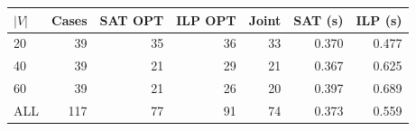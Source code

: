 \begin{tabular}{@{}lrrrrrr@{}}
\toprule
$|V|$ & Cases & SAT OPT & ILP OPT & Joint & SAT (s) & ILP (s)\\
\midrule
20 & 39 & 35 & 36 & 33 & 0.370 & 0.477\\
40 & 39 & 21 & 29 & 21 & 0.367 & 0.625\\
60 & 39 & 21 & 26 & 20 & 0.397 & 0.689\\
ALL & 117 & 77 & 91 & 74 & 0.373 & 0.559\\
\bottomrule
\end{tabular}
